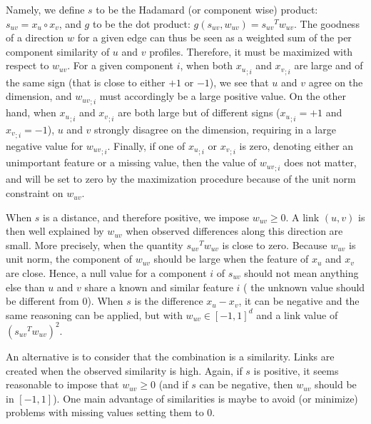Namely, we define $s$ to be the Hadamard (or component wise) product: $s_{uv} = x_u \circ x_v$, and
$g$ to be the dot product: $g(s_{uv}, w_{uv}) = {s_{uv}}^T w_{uv}$. The goodness of a direction $w$
for a given edge can thus be seen as a weighted sum of the per component similarity of $u$ and $v$
profiles. Therefore, it must be maximized with respect to $w_{uv}$. For a given component $i$, when
both ${x_u}_{;i}$ and ${x_v}_{;i}$ are large and of the same sign (that is close to either $+1$ or
$-1$), we see that $u$ and $v$ agree on the \ith{} dimension, and ${w_{uv}}_{;i}$ must accordingly
be a large positive value. On the other hand, when ${x_u}_{;i}$ and ${x_v}_{;i}$ are both large but
of different signs (\eg ${x_u}_{;i} = +1$ and ${x_v}_{;i} = -1$), $u$ and $v$ strongly disagree on
the \ith{} dimension, requiring in a large negative value for ${w_{uv}}_{;i}$.  Finally, if one of
${x_u}_{;i}$ or ${x_v}_{;i}$ is zero, denoting either an unimportant feature or a missing value,
then the value of ${w_{uv}}_{;i}$ does not matter, and will be set to zero by the maximization
procedure because of the unit norm constraint on $w_{uv}$.

\begin{aside}
When $s$ is a distance, and therefore positive, we impose $w_{uv}\geq 0$. A link $(u,v)$ is then
well explained by $w_{uv}$ when observed differences along this direction are small. More precisely,
when the quantity ${s_{uv}}^T w_{uv}$ is close to zero. Because $w_{uv}$ is unit norm, the \ith{}
component of $w_{uv}$ should be large when the \ith{} feature of $x_u$ and $x_v$ are close. Hence, a
null value for a component $i$ of $s_{uv}$ should not mean anything else than $u$ and $v$ share a
known and similar feature $i$ (\eg{} the unknown value should be different from $0$). When $s$ is
the difference $x_u - x_v$, it can be negative and the same reasoning can be applied, but with
$w_{uv}\in [-1,1]^d$ and a link value of $\left({s_{uv}}^T w_{uv}\right)^2$.

An alternative is to consider that the combination is a similarity. Links are created when the
observed similarity is high. Again, if $s$ is positive, it seems reasonable to impose that
$w_{uv}\geq0$ (and if $s$ can be negative, then $w_{uv}$ should be in $[-1,1]$). One main advantage
of similarities is maybe to avoid (or minimize) problems with missing values setting them to 0.
\end{aside}

\medskip

